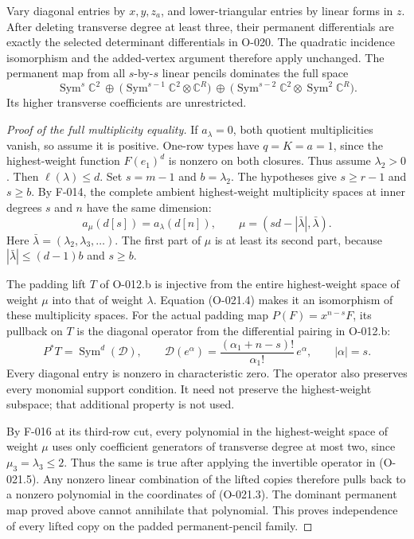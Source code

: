 Vary diagonal entries by $x,y,z_a$, and lower-triangular
entries by linear forms in $z$. After deleting transverse
degree at least three, their permanent differentials are
exactly the selected determinant differentials in O-020.
The quadratic incidence isomorphism and the added-vertex
argument therefore apply unchanged. The permanent map
from all $s$-by-$s$ linear pencils dominates the full space
\[
 \operatorname{Sym}^s\mathbb C^2
 \ \oplus\ \bigl(\operatorname{Sym}^{s-1}\mathbb C^2
                                      \otimes\mathbb C^R\bigr)
 \ \oplus\ \bigl(\operatorname{Sym}^{s-2}\mathbb C^2
                               \otimes\operatorname{Sym}^2\mathbb C^R\bigr).
                                                               \tag{O-021.3}
\]
Its higher transverse coefficients are unrestricted.

\begin{proof}[Proof of the full multiplicity equality]
If $a_\lambda=0$, both quotient multiplicities vanish,
so assume it is positive. One-row types have
$q=K=a=1$, since the highest-weight function $F(e_1)^d$
is nonzero on both closures. Thus assume $\lambda_2>0$.
Then $\ell(\lambda)\leq d$.
Set $s=m-1$ and $b=\lambda_2$. The hypotheses give
$s\geq r-1$ and $s\geq b$. By F-014, the complete
ambient highest-weight multiplicity spaces at inner degrees
$s$ and $n$ have the same dimension:
\[
 a_\mu(d[s])=a_\lambda(d[n]),\qquad
             \mu=(sd-|\bar\lambda|,\bar\lambda).
                                                               \tag{O-021.4}
\]
Here $\bar\lambda=(\lambda_2,\lambda_3,\ldots)$.
The first part of $\mu$ is at least its second part,
because $|\bar\lambda|\leq(d-1)b$ and $s\geq b$.

The padding lift $T$ of O-012.b is injective from the
entire highest-weight space of weight $\mu$ into that
of weight $\lambda$. Equation (O-021.4) makes it an
isomorphism of these multiplicity spaces.
For the actual padding map
$P(F)=x^{n-s}F$, its pullback on $T$ is the diagonal
operator from the differential pairing in O-012.b:
\[
 P^*T=\operatorname{Sym}^d(\mathcal D),\qquad
 \mathcal D(e^\alpha)
        =\frac{(\alpha_1+n-s)!}{\alpha_1!}\,e^\alpha,
                 \qquad |\alpha|=s.                   \tag{O-021.5}
\]
Every diagonal entry is nonzero in characteristic zero.
The operator also preserves every monomial support condition.
It need not preserve the highest-weight subspace; that
additional property is not used.

By F-016 at its third-row cut, every polynomial in the
highest-weight space of weight $\mu$ uses only coefficient
generators of transverse degree at most two, since
$\mu_3=\lambda_3\leq2$. Thus the same is true after
applying the invertible operator in (O-021.5).
Any nonzero linear combination of the lifted copies
therefore pulls back to a nonzero polynomial in the
coordinates of (O-021.3). The dominant permanent map
proved above cannot annihilate that polynomial.
This proves independence of every lifted copy on the
padded permanent-pencil family.


\end{proof}
